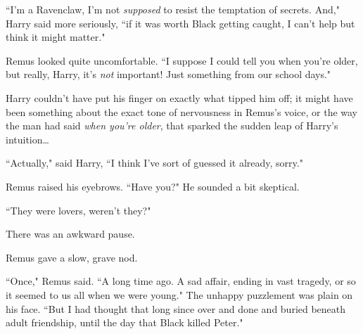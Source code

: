 ``I'm a Ravenclaw, I'm not \emph{supposed} to resist the temptation of secrets. And," Harry said more seriously, ``if it was worth Black getting caught, I can't help but think it might matter."

Remus looked quite uncomfortable. ``I suppose I could tell you when you're older, but really, Harry, it's \emph{not} important! Just something from our school days."

Harry couldn't have put his finger on exactly what tipped him off; it might have been something about the exact tone of nervousness in Remus's voice, or the way the man had said \emph{when you're older}, that sparked the sudden leap of Harry's intuition{\ldots}

``Actually," said Harry, ``I think I've sort of guessed it already, sorry."

Remus raised his eyebrows. ``Have you?" He sounded a bit skeptical.

``They were lovers, weren't they?"

There was an awkward pause.

Remus gave a slow, grave nod.

``Once," Remus said. ``A long time ago. A sad affair, ending in vast tragedy, or so it seemed to us all when we were young." The unhappy puzzlement was plain on his face. ``But I had thought that long since over and done and buried beneath adult friendship, until the day that Black killed Peter."

